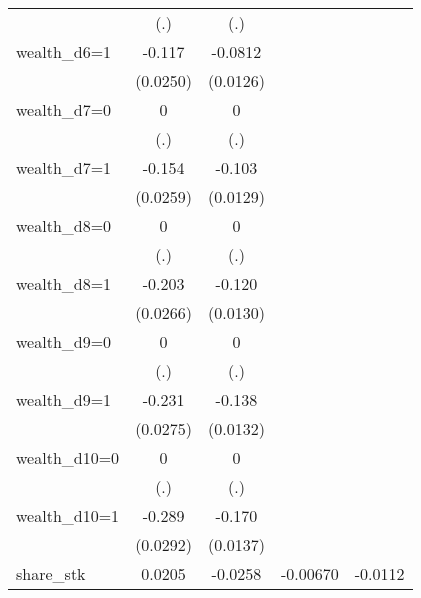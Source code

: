 \begin{table}[htbp]
\begin{tabular}{l*{4}{c}}
                &      (.)         &      (.)         &                  &                  \\
wealth\_d6=1     &   -0.117\sym{***}&  -0.0812\sym{***}&                  &                  \\
                & (0.0250)         & (0.0126)         &                  &                  \\
wealth\_d7=0     &        0         &        0         &                  &                  \\
                &      (.)         &      (.)         &                  &                  \\
wealth\_d7=1     &   -0.154\sym{***}&   -0.103\sym{***}&                  &                  \\
                & (0.0259)         & (0.0129)         &                  &                  \\
wealth\_d8=0     &        0         &        0         &                  &                  \\
                &      (.)         &      (.)         &                  &                  \\
wealth\_d8=1     &   -0.203\sym{***}&   -0.120\sym{***}&                  &                  \\
                & (0.0266)         & (0.0130)         &                  &                  \\
wealth\_d9=0     &        0         &        0         &                  &                  \\
                &      (.)         &      (.)         &                  &                  \\
wealth\_d9=1     &   -0.231\sym{***}&   -0.138\sym{***}&                  &                  \\
                & (0.0275)         & (0.0132)         &                  &                  \\
wealth\_d10=0    &        0         &        0         &                  &                  \\
                &      (.)         &      (.)         &                  &                  \\
wealth\_d10=1    &   -0.289\sym{***}&   -0.170\sym{***}&                  &                  \\
                & (0.0292)         & (0.0137)         &                  &                  \\
share\_stk       &   0.0205         &  -0.0258         & -0.00670         &  -0.0112         \\

\end{tabular}
\end{table}
